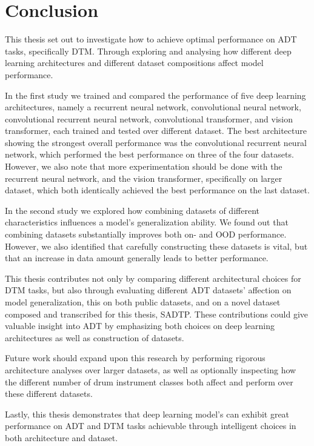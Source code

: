 \chapter{Conclusion}

This thesis set out to investigate how to achieve optimal performance on \acrfull{ADT} tasks, specifically \acrfull{DTM}. Through exploring and analysing how different deep learning architectures and different dataset compositions affect model performance. 

In the first study we trained and compared the performance of five deep learning architectures, namely a recurrent neural network, convolutional neural network, convolutional recurrent neural network, convolutional transformer, and vision transformer, each trained and tested over different dataset. The best architecture showing the strongest overall performance was the convolutional recurrent neural network, which performed the best performance on three of the four datasets. However, we also note that more experimentation should be done with the recurrent neural network, and the vision transformer, specifically on larger dataset, which both identically achieved the best performance on the last dataset.

In the second study we explored how combining datasets of different characteristics influences a model's generalization ability. We found out that combining datasets substantially improves both on- and \acrfull{OOD} performance. However, we also identified that carefully constructing these datasets is vital, but that an increase in data amount generally leads to better performance.

This thesis contributes not only by comparing different architectural choices for \gls{DTM} tasks, but also through evaluating different \gls{ADT} datasets' affection on model generalization, this on both public datasets, and on a novel dataset composed and transcribed for this thesis, SADTP. These contributions could give valuable insight into \gls{ADT} by emphasizing both choices on deep learning architectures as well as construction of datasets.

Future work should expand upon this research by performing rigorous architecture analyses over larger datasets, as well as optionally inspecting how the different number of drum instrument classes both affect and perform over these different datasets.

Lastly, this thesis demonstrates that deep learning model's can exhibit great performance on \gls{ADT} and \gls{DTM} tasks achievable through intelligent choices in both architecture and dataset.